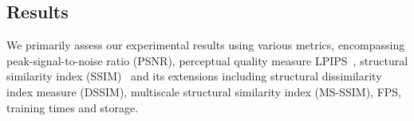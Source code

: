 \documentclass[10pt,twocolumn,letterpaper]{article}
\begin{document}
\subsection{Results}
\label{subsec:result}
We primarily assess our experimental results using various metrics, encompassing peak-signal-to-noise ratio (PSNR), perceptual quality measure LPIPS~\cite{lpips}, structural similarity index (SSIM)~\cite{ssim} and its extensions including structural dissimilarity index measure (DSSIM), multiscale structural similarity index (MS-SSIM), FPS, training times and storage. 
\begin{table} 
\centering
\caption{Quantitative results on the Neu3D~\cite{li2022neural} dataset with the rendering resolution of 1352$\times$1014.}
\end{table}
\end{document}
